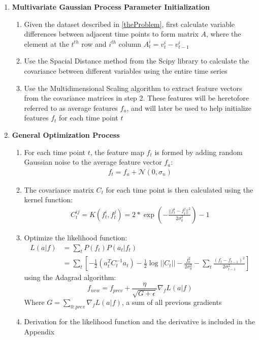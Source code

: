 \documentclass[12pt]{article}
\begin{document}
\begin{enumerate}
\item \textbf{Multivariate Gaussian Process Parameter Initialization}\par
\begin{enumerate}
\item Given the dataset described in \ref{theProblem}, first calculate variable differences between adjacent time points to form matrix $A$, where the element at the $t^{th}$ row and $i^{th}$ column $A^i_t = v^i_t - v^i_{t-1}$
\item Use the Spacial Distance method from the Scipy library to calculate the covariance between different variables using the entire time series
\item Use the Multidimensional Scaling algorithm to extract feature vectors from the covariance matrices in step 2. These features will be heretofore referred to as average features $f_a$, and will later be used to help initialize features $f_t$ for each time point $t$
\end{enumerate}
\item \textbf{General Optimization Process}\par
\begin{enumerate}
\item For each time point $t$, the feature map $f_t$ is formed by adding random Gaussian noise to the average feature vector $f_a$:
\begin{align*}
f_t = f_a+\mathcal{N}(0, \sigma_n)
\end{align*}
\item The covariance matrix $C_t$ for each time point is then calculated using the kernel function:
\begin{align*}
C^{ij}_t=K(f_t^i,f_t^j)=2* \exp(-\frac{||f^i_t-f^j_t||^2}{2\sigma_k^2})-1
\end{align*}
\item Optimize the likelihood function:
\begin{align*}
L(a|f)&= \sum_t P(f_t)P(a_t|f_t)\\
&=\sum_t[-\frac12 (a_t^TC_t^{-1}a_t)-\frac12\log||C_t||-\frac{f_0^2}{2\sigma_0^2}-\sum_t\frac{(f_t-f_{t-1})^2}{2\sigma_{t-1}^2}]
\end{align*}
using the Adagrad algorithm:
\begin{equation*}
f_{new} = f_{prev}+\frac{\eta}{\sqrt{G+\epsilon}}\nabla_f L(a|f)
\end{equation*}
Where $G = \sum_{0:prev} \nabla_f L(a|f)$, a sum of all previous gradients
\item Derivation for the likelihood function and the derivative is included in the Appendix
\end{enumerate}
\end{enumerate}
\end{document}
